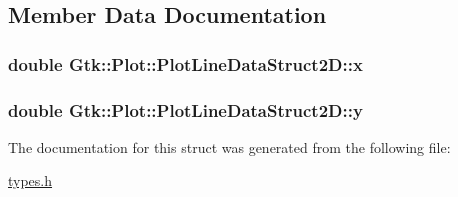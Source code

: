 \subsection{Member Data Documentation}
\hypertarget{structGtk_1_1Plot_1_1PlotLineDataStruct2D_abc9c02f23c4bd8cdb29bc3c497ca121b}{
\subsubsection[{x}]{\setlength{\rightskip}{0pt plus 5cm}double {\bf Gtk::Plot::PlotLineDataStruct2D::x}}}
\label{structGtk_1_1Plot_1_1PlotLineDataStruct2D_abc9c02f23c4bd8cdb29bc3c497ca121b}
\hypertarget{structGtk_1_1Plot_1_1PlotLineDataStruct2D_a9a13b8cff1bbb4428b1affe716379e0d}{
\subsubsection[{y}]{\setlength{\rightskip}{0pt plus 5cm}double {\bf Gtk::Plot::PlotLineDataStruct2D::y}}}
\label{structGtk_1_1Plot_1_1PlotLineDataStruct2D_a9a13b8cff1bbb4428b1affe716379e0d}


The documentation for this struct was generated from the following file:\begin{DoxyCompactItemize}
\item 
\hyperlink{types_8h}{types.h}\end{DoxyCompactItemize}
